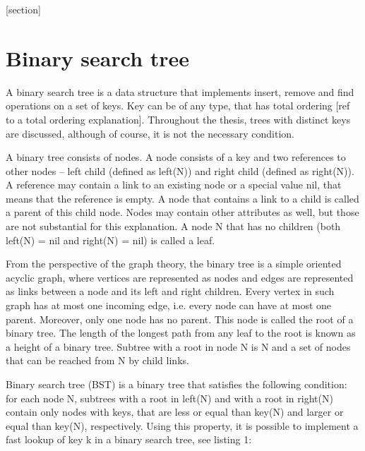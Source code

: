 

[section]
\newcommand{\req}[2]{
\stepcounter{reqcounter}
\indent\par
\textbf{#1\arabic{reqcounter} #2}
}
\newcommand{\funcreq}[1]{\req{F}{#1}}
\newcommand{\nonfreq}[1]{\req{N}{#1}}

\section{Binary search tree}

A binary search tree is a data structure that implements insert, remove and find operations on a set of keys. Key can be of any type, that has total ordering [ref to a total ordering explanation]. Throughout the thesis, trees with distinct keys are discussed, although of course, it is not the necessary condition.

A binary tree consists of nodes. A node consists of a key and two references to other nodes – left child (defined as left(N)) and right child (defined as right(N)). A reference may contain a link to an existing node or a special value nil, that means that the reference is empty. A node that contains a link to a child is called a parent of this child node. Nodes may contain other attributes as well, but those are not substantial for this explanation. A node N that has no children (both left(N) = nil and right(N) = nil) is called a leaf.

From the perspective of the graph theory, the binary tree is a simple oriented acyclic graph, where vertices are represented as nodes and edges are represented as links between a node and its left and right children. Every vertex in such graph has at most one incoming edge, i.e. every node can have at most one parent. Moreover, only one node has no parent. This node is called the root of a binary tree. The length of the longest path from any leaf to the root is known as a height of a binary tree. Subtree with a root in node N is N and a set of nodes that can be reached from N by child links.

Binary search tree (BST) is a binary tree that satisfies the following condition: for each node N, subtrees with a root in left(N) and with a root in right(N) contain only nodes with keys, that are less or equal than key(N) and larger or equal than key(N), respectively. Using this property, it is possible to implement a fast lookup of key k in a binary search tree, see listing 1:

